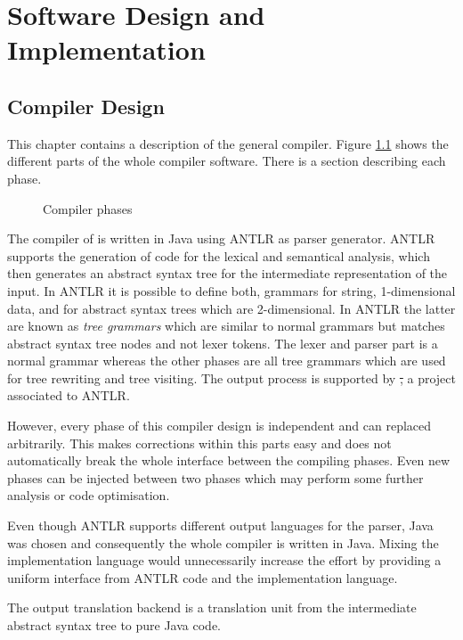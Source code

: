 \chapter{Software Design and Implementation}
\label{ctr:swDesignImplementation}

\section{Compiler Design}
This chapter contains a description of the general compiler. Figure
\ref{fig:compilerPhase} shows the different parts of the whole compiler
software. There is a section describing each phase.

\begin{figure}[ht]
	\centerline{}
	\caption{Compiler phases}
	\label{fig:compilerPhase}
\end{figure}

The compiler of \ooplss is written in Java using ANTLR as parser
generator. ANTLR supports the generation of code for the lexical and
semantical analysis, which then generates an abstract syntax tree for
the intermediate representation of the input. In ANTLR it is possible to
define both, grammars for string, 1-dimensional data, and for abstract syntax
trees which are 2-dimensional. In ANTLR the latter are known as \emph{tree
grammars} which are similar to normal grammars but matches abstract
syntax tree nodes and not lexer tokens. The lexer and parser part is a
normal grammar whereas the other phases are all tree grammars which are
used for tree rewriting and tree visiting. The output process
is supported by \st, a project associated to ANTLR.

However, every phase of this compiler design is independent and can
replaced arbitrarily. This makes corrections within this parts easy and
does not automatically break the whole interface between the compiling
phases. Even new phases can be injected between two phases which may
perform some further analysis or code optimisation.

Even though ANTLR supports different output languages for the parser, Java was
chosen and consequently the whole compiler is written in Java. Mixing
the implementation language would unnecessarily increase the effort
by providing a uniform interface from ANTLR code and the implementation
language.

The output translation backend is a translation unit from the
intermediate abstract syntax tree to pure Java code.


